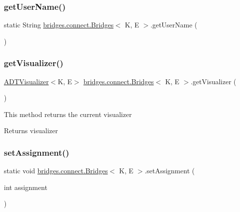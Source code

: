 \hypertarget{classbridges_1_1connect_1_1_bridges_a5ff3fdd97d4c71c9c2141c3355e417aa}{}\label{classbridges_1_1connect_1_1_bridges_a5ff3fdd97d4c71c9c2141c3355e417aa} 
\subsubsection{\texorpdfstring{get\+User\+Name()}{getUserName()}}
{\footnotesize\ttfamily static String \hyperlink{classbridges_1_1connect_1_1_bridges}{bridges.\+connect.\+Bridges}$<$ K, E $>$.get\+User\+Name (\begin{DoxyParamCaption}{ }\end{DoxyParamCaption})\hspace{0.3cm}{\ttfamily [static]}}

\hypertarget{classbridges_1_1connect_1_1_bridges_a7193b48c9dc01b04dfcf0d66fa2f59fb}{}\label{classbridges_1_1connect_1_1_bridges_a7193b48c9dc01b04dfcf0d66fa2f59fb} 
\subsubsection{\texorpdfstring{get\+Visualizer()}{getVisualizer()}}
{\footnotesize\ttfamily \hyperlink{classbridges_1_1base_1_1_a_d_t_visualizer}{A\+D\+T\+Visualizer}$<$K, E$>$ \hyperlink{classbridges_1_1connect_1_1_bridges}{bridges.\+connect.\+Bridges}$<$ K, E $>$.get\+Visualizer (\begin{DoxyParamCaption}{ }\end{DoxyParamCaption})}

This method returns the current visualizer \begin{DoxyReturn}{Returns}
visualizer 
\end{DoxyReturn}
\hypertarget{classbridges_1_1connect_1_1_bridges_a24c91901a59ab8b715a864ab8a4d9cdc}{}\label{classbridges_1_1connect_1_1_bridges_a24c91901a59ab8b715a864ab8a4d9cdc} 
\subsubsection{\texorpdfstring{set\+Assignment()}{setAssignment()}}
{\footnotesize\ttfamily static void \hyperlink{classbridges_1_1connect_1_1_bridges}{bridges.\+connect.\+Bridges}$<$ K, E $>$.set\+Assignment (\begin{DoxyParamCaption}\item[{int}]{assignment }\end{DoxyParamCaption})\hspace{0.3cm}{\ttfamily [static]}}

